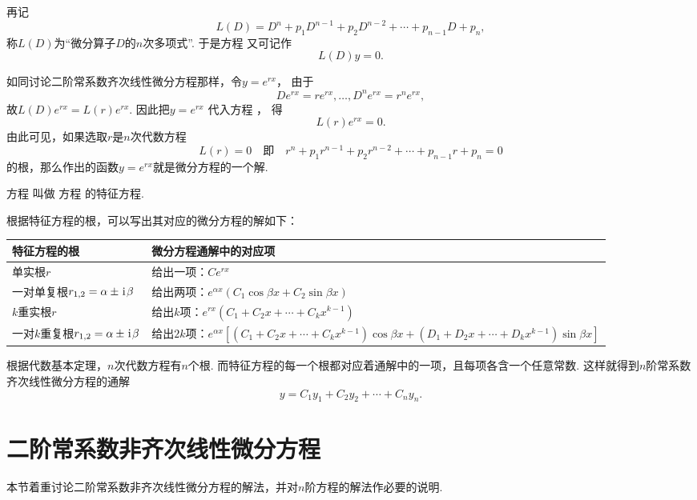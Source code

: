 再记\[
L(D) = D^n + p_1 D^{n-1} + p_2 D^{n-2} + \dotsb + p_{n-1} D + p_n,
\]称\(L(D)\)为“微分算子\(D\)的\(n\)次多项式”.
于是方程  又可记作\[
L(D) y = 0.
\]

如同讨论二阶常系数齐次线性微分方程那样，令\(y = e^{rx}\)，%
由于\[
D e^{rx} = r e^{rx},\dotsc,D^n e^{rx} = r^n e^{rx},
\]
故\(L(D) e^{rx} = L(r) e^{rx}\).
因此把\(y = e^{rx}\)%
代入方程 ，%
得\[
L(r) e^{rx} = 0.
\]
由此可见，如果选取\(r\)是\(n\)次代数方程
\begin{equation}\label{equation:微分方程概论.n阶常系数齐次线性微分方程的一般形式.特征方程}
L(r) = 0
\quad\text{即}\quad
r^n + p_1 r^{n-1} + p_2 r^{n-2} + \dotsb + p_{n-1} r + p_n = 0
\end{equation}
的根，那么作出的函数\(y = e^{rx}\)就是微分方程的一个解.

方程  叫做%
方程  的特征方程.

根据特征方程的根，可以写出其对应的微分方程的解如下：
\begin{center}
\begin{tabular}{p{3cm}|p{9cm}}
\hline
特征方程的根 & 微分方程通解中的对应项 \\ \hline
单实根\(r\) & 给出一项：\(C e^{rx}\) \\ \hline
一对单复根\newline\(r_{1,2}=\alpha\pm\kern1pt\mathrm{i}\kern1pt\beta\)
	& 给出两项：\(e^{\alpha x} (C_1 \cos\beta x + C_2 \sin\beta x)\) \\ \hline
\(k\)重实根\(r\)
	& 给出\(k\)项：\(e^{rx} (C_1 + C_2 x + \dotsb + C_k x^{k-1})\) \\ \hline
一对\(k\)重复根\newline\(r_{1,2}=\alpha\pm\kern1pt\mathrm{i}\kern1pt\beta\)
	& 给出\(2k\)项：\(e^{\alpha x} [ (C_1+C_2 x+\dotsb+C_k x^{k-1}) \cos\beta x + (D_1+D_2 x+\dotsb+D_k x^{k-1})\sin\beta x ]\)
\\ \hline
\end{tabular}
\end{center}

根据代数基本定理，\(n\)次代数方程有\(n\)个根.
而特征方程的每一个根都对应着通解中的一项，且每项各含一个任意常数.
这样就得到\(n\)阶常系数齐次线性微分方程的通解\[
y = C_1 y_1 + C_2 y_2 + \dotsb + C_n y_n.
\]

\section{二阶常系数非齐次线性微分方程}\label{section:微分方程.常系数非齐次线性微分方程}
本节着重讨论二阶常系数非齐次线性微分方程的解法，并对\(n\)阶方程的解法作必要的说明.

